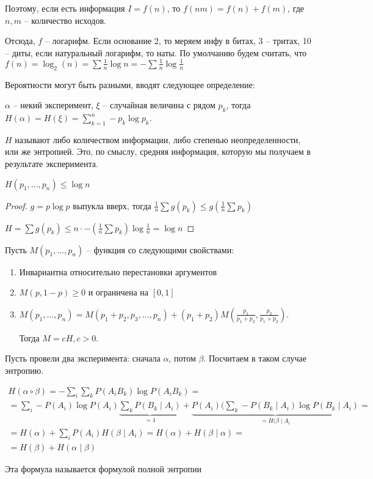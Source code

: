 Поэтому, если есть информация $I = f(n)$, то $f(nm) = f(n) + f(m)$, где $n, m$ -- количество исходов.

Отсюда, $f$ -- логарифм. Если основание 2, то меряем инфу в битах, 3 -- тритах, 10 -- диты, если натуральный логарифм, то наты.
По умолчанию будем считать, что $f(n) = \log_2(n) = \sum \frac1n \log n = -\sum \frac1n \log \frac1n$ 

Вероятности могут быть разными, вводят следующее определение:
\begin{Def}
$\alpha$ -- некий эксперимент, $\xi$ -- случайная величина с рядом $p_k$, тогда $H(\alpha) = H(\xi) = \sum\limits_{k=1}^n -p_k \log p_k$.

$H$ называют либо количеством информации, либо степенью неопределенности, или же энтропией.
Это, по смыслу, средняя информация, которую мы получаем в результате эксперимента.
\end{Def}

\begin{theorem}
$H(p_1, \dots, p_n) \leq \log n$
\end{theorem}
\begin{proof}
$g = p \log p$ выпукла вверх, тогда $\frac1n \sum g(p_k) \leq g(\frac1n \sum p_k)$

$H = \sum g(p_k) \leq n \cdot -(\frac1n \sum p_k) \log \frac1n = \log n$
\end{proof}

\begin{theorem}
Пусть $M(p_1, \dots, p_n)$ -- функция со следующими свойствами:
\begin{enumerate}
\item Инвариантна относительно перестановки аргументов
\item $M(p, 1 -p ) \geq 0$ и ограничена на $[0, 1]$
\item $M(p_1, \dots, p_n) = M(p_1 + p_2, p_3, \dots, p_n) + (p_1 + p_2) M(\frac{p_1}{p_1 + p_2}, \frac{p_2}{p_1 + p_2})$.

Тогда $M = cH, c > 0$.
\end{enumerate}
\end{theorem}

Пусть провели два эксперимента: сначала $\alpha$, потом $\beta$. 
Посчитаем в таком случае энтропию.

\begin{gather*} 
H(\alpha \circ \beta) = -\sum\limits_i \sum\limits_k P(A_i B_k) \log  P(A_i B_k) = \\
= \sum\limits_i -P(A_i) \log P(A_i)\underbrace{\sum\limits_k P(B_k \mid A_i)}_{=1} + \underbrace{P(A_i)(\sum\limits_k -P(B_k \mid A_i) \log P(B_k \mid A_i)}_{=H(\beta \mid A_i} = \\
= H(\alpha) + \sum\limits_i P(A_i)H(\beta \mid A_i) = H(\alpha) + H(\beta \mid \alpha) =  \\
= H(\beta) + H(\alpha \mid \beta)
\end{gather*}

Эта формула называется формулой полной энтропии